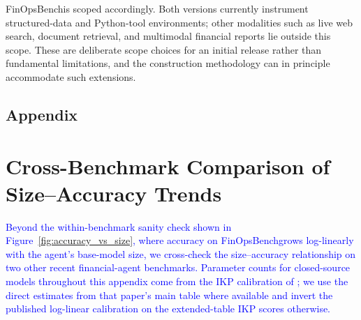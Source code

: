 \documentclass[11pt]{article}
\newcommand{\edit}[1]{\textcolor{blue}{#1}}
\newcommand{\editN}[1]{\textcolor{editgreen}{#1}}
\newcommand{\datasetname}{FinOpsBench}\xspace
\newcommand{\groundedfinqa}{FinOpsBench-v2}\xspace
\begin{document}
\editN{\datasetname is scoped accordingly. Both versions currently instrument structured-data and Python-tool environments; other modalities such as live web search, document retrieval, and multimodal financial reports lie outside this scope. These are deliberate scope choices for an initial release rather than fundamental limitations, and the construction methodology can in principle accommodate such extensions.}




\appendix

\editN{\section*{Appendix}}

\section{Cross-Benchmark Comparison of Size--Accuracy Trends}
\label{app:cross_benchmark}

\edit{Beyond the within-benchmark sanity check shown in Figure~\ref{fig:accuracy_vs_size}, where accuracy on \datasetname grows log-linearly with the agent's base-model size, we cross-check the size--accuracy relationship on two other recent financial-agent benchmarks. Parameter counts for closed-source models throughout this appendix come from the IKP calibration of \citet{li2026incompressible}; we use the direct estimates from that paper's main table where available and invert the published log-linear calibration on the extended-table IKP scores otherwise.}
\end{document}
